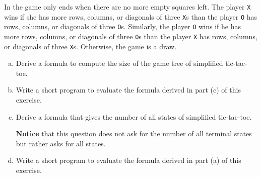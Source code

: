 \exercise
In  the game only ends when there are no more empty squares left.
The player \texttt{X} wins if she has more rows, columns, or diagonals of three \texttt{X}s than the player
\texttt{O} has rows, columns, or diagonals of three \texttt{O}s.  Similarly, the player \texttt{O} wins
if he has more rows, columns, or diagonals of three \texttt{O}s than the player \texttt{X} has rows, columns,
or diagonals of three \texttt{X}s.  Otherwise, the game is a draw. 
\begin{enumerate}[(a)]
\item Derive a formula to compute the size of the game tree of simplified tic-tac-toe.
\item Write a short program to evaluate the formula derived in part (c) of this exercise.
\item Derive a formula that gives the number of all states of simplified tic-tac-toe.  

      \textbf{Notice} that this question does not ask for the number of all terminal states but rather asks for
      all states. 
\item Write a short program to evaluate the formula derived in part (a) of this exercise.
\end{enumerate}


